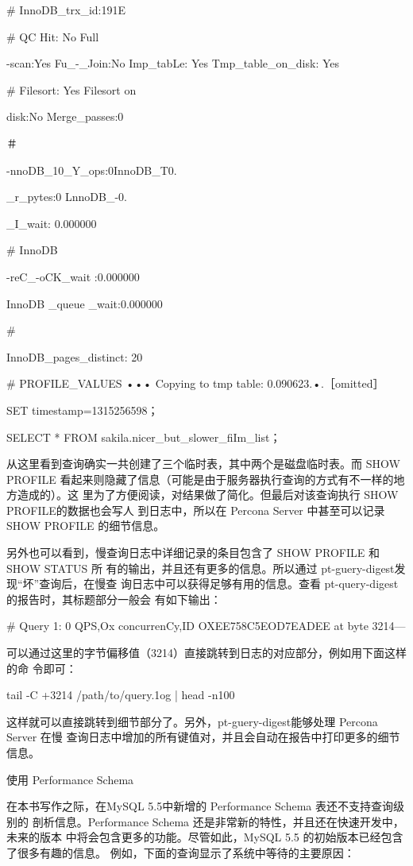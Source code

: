 {# InnoDB\_trx\_id:191E

# QC Hit: No Full

-scan:Yes Fu\_-\_Join:No Imp\_tabLe: Yes Tmp\_table\_on\_disk: Yes

# Filesort: Yes Filesort on

disk:No Merge\_passes:0

＃

-nnoDB\_10\_Y\_ops:0InnoDB\_T0.

\_r\_pytes:0 LnnoDB\_-0.

\_I\_wait: 0.000000

# InnoDB

-reC\_-oCK\_wait :0.000000

InnoDB \_queue \_wait:0.000000

#

InnoDB\_pages\_distinct: 20

# PROFILE\_VALUES ••• Copying to tmp table: 0.090623.•.［omitted］

SET timestamp=1315256598；

SELECT * FROM sakila.nicer\_but\_slower\_fiIm\_list；

从这里看到查询确实一共创建了三个临时表，其中两个是磁盘临时表。而 SHOW PROFILE
看起来则隐藏了信息（可能是由于服务器执行查询的方式有不一样的地方造成的）。这
里为了方便阅读，对结果做了简化。但最后对该查询执行 SHOW PROFILE的数据也会写人
到日志中，所以在 Percona Server 中甚至可以记录 SHOW PROFILE 的细节信息。

另外也可以看到，慢查询日志中详细记录的条目包含了 SHOW PROFILE 和 SHOW STATUS 所
有的输出，并且还有更多的信息。所以通过 pt-guery-digest发现“坏”查询后，在慢查
询日志中可以获得足够有用的信息。查看 pt-query-digest的报告时，其标题部分一般会
有如下输出：

# Query 1: 0 QPS,Ox concurrenCy,ID OXEE758C5EOD7EADEE at byte 3214—

可以通过这里的字节偏移值（3214）直接跳转到日志的对应部分，例如用下面这样的命
令即可：

tail -C +3214 /path/to/query.1og | head -n100

这样就可以直接跳转到细节部分了。另外，pt-guery-digest能够处理 Percona Server 在慢
查询日志中增加的所有键值对，并且会自动在报告中打印更多的细节信息。

使用 Performance Schema

在本书写作之际，在MySQL 5.5中新增的 Performance Schema 表还不支持查询级别的
剖析信息。Performance Schema 还是非常新的特性，并且还在快速开发中，未来的版本
中将会包含更多的功能。尽管如此，MySQL 5.5 的初始版本已经包含了很多有趣的信息。
例如，下面的查询显示了系统中等待的主要原因：

}
